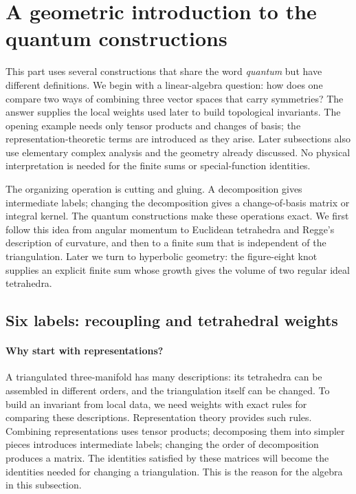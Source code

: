 \section{A geometric introduction to the quantum constructions}
\label{sec:quantumintro}

This part uses several constructions that share the word
\emph{quantum} but have different definitions. We begin with a
linear-algebra question: how does one compare two ways of combining
three vector spaces that carry symmetries? The answer supplies the
local weights used later to build topological invariants. The opening
example needs only tensor products and changes of basis; the
representation-theoretic terms are introduced as they arise.
Later subsections also use elementary complex analysis and the
geometry already discussed. No physical interpretation is needed
for the finite sums or special-function identities.

The organizing operation is cutting and gluing. A decomposition gives
intermediate labels; changing the decomposition gives a change-of-basis
matrix or integral kernel. The quantum constructions make these
operations exact. We first follow this idea from angular momentum to
Euclidean tetrahedra and Regge's description of curvature, and then to
a finite sum that is independent of the triangulation. Later we turn
to hyperbolic geometry: the figure-eight knot supplies an explicit
finite sum whose growth gives the volume of two regular ideal tetrahedra.

\subsection{Six labels: recoupling and tetrahedral weights}
\label{sec:introrecoupling}

\paragraph{Why start with representations?}
A triangulated three-manifold has many descriptions: its tetrahedra
can be assembled in different orders, and the triangulation itself
can be changed. To build an invariant from local data, we need
weights with exact rules for comparing these descriptions.
Representation theory provides such rules. Combining representations
uses tensor products; decomposing them into simpler pieces introduces
intermediate labels; changing the order of decomposition produces a
matrix. The identities satisfied by these matrices will become the
identities needed for changing a triangulation. This is the reason
for the algebra in this subsection.

